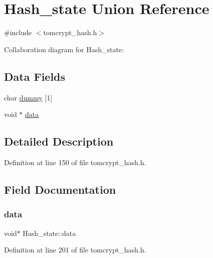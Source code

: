 \hypertarget{unionHash__state}{}\section{Hash\+\_\+state Union Reference}
\label{unionHash__state}


{\ttfamily \#include $<$tomcrypt\+\_\+hash.\+h$>$}



Collaboration diagram for Hash\+\_\+state\+:
\subsection*{Data Fields}
\begin{DoxyCompactItemize}
\item 
char \mbox{\hyperlink{unionHash__state_ac7afd8080583c935f3ab2bb1f24c7945}{dummy}} \mbox{[}1\mbox{]}
\item 
void $\ast$ \mbox{\hyperlink{unionHash__state_a936b335f7aa23b39f89ee6aa3bb3ff17}{data}}
\end{DoxyCompactItemize}


\subsection{Detailed Description}


Definition at line 150 of file tomcrypt\+\_\+hash.\+h.



\subsection{Field Documentation}
\mbox{\label{unionHash__state_a936b335f7aa23b39f89ee6aa3bb3ff17}} 
\subsubsection{\texorpdfstring{data}{data}}
{\footnotesize\ttfamily void$\ast$ Hash\+\_\+state\+::data}



Definition at line 201 of file tomcrypt\+\_\+hash.\+h.

\mbox{\label{unionHash__state_ac7afd8080583c935f3ab2bb1f24c7945}} 
